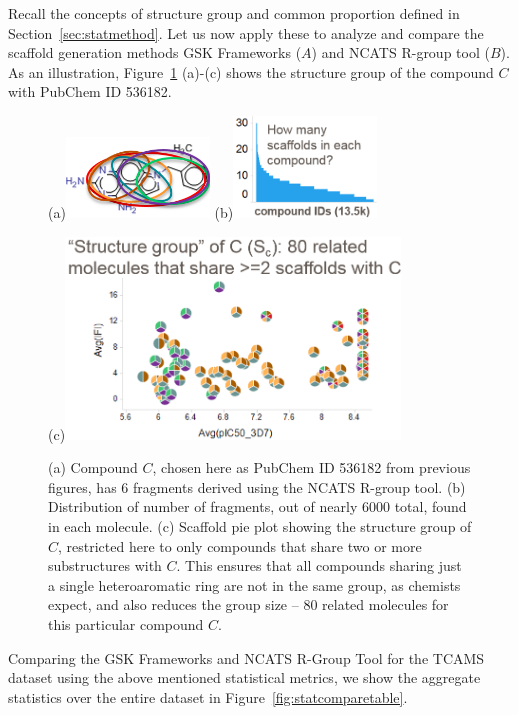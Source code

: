 \documentclass[journal=jacsat,manuscript=article]{achemso}
\newcommand*\fref[1]{Figure~\ref{fig:#1}}
\newcommand*\sref[1]{Section~\ref{sec:#1}}
\begin{document}
Recall the concepts of structure group and common proportion defined in \sref{statmethod}.  Let us now apply these to analyze and compare the scaffold generation methods GSK Frameworks ($A$) and NCATS R-group tool ($B$). As an illustration, \fref{strucgroup} (a)-(c) shows the structure group of the compound $C$ with PubChem ID 536182. 
\begin{figure}
\centering
  \begin{minipage}[b][0.2\textheight][s]{0.3\textwidth}
  \centering
  (a)\includegraphics[width=1.5in]{fig/mol_6scaf.png}
  (b)\includegraphics[width=1.5in]{fig/howmany_scaf.png}
  \end{minipage}
  (c)\includegraphics[width=3.5in]{fig/structure_group_C.png}
  \caption{(a) Compound $C$, chosen here as PubChem ID 536182 from previous figures, has 6 fragments derived using the NCATS R-group tool. (b) Distribution of number of fragments, out of nearly 6000 total, found in each molecule. (c) Scaffold pie plot showing the structure group of $C$, restricted here to only compounds that share two or more substructures with $C$. This ensures that all compounds sharing just a single heteroaromatic ring are not in the same group, as chemists expect, and also reduces the group size -- 80 related molecules for this particular compound $C$.}
    \label{fig:strucgroup}
\end{figure}


Comparing the GSK Frameworks and NCATS R-Group Tool for the TCAMS dataset using the above mentioned statistical metrics, we show the aggregate statistics over the entire dataset in \fref{statcomparetable}.  
\end{document}
